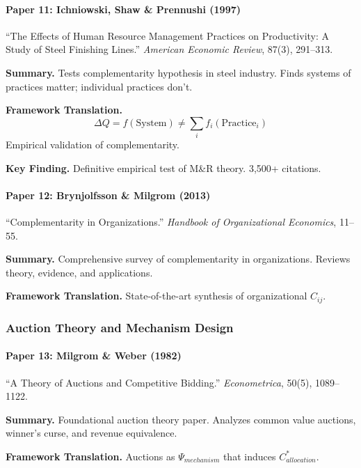 \paragraph{Paper 11: Ichniowski, Shaw \& Prennushi (1997)}

``The Effects of Human Resource Management Practices on Productivity: A Study of Steel Finishing Lines.''
\textit{American Economic Review}, 87(3), 291--313.

\textbf{Summary.}
Tests complementarity hypothesis in steel industry. Finds systems of practices 
matter; individual practices don't.

\textbf{Framework Translation.}
\begin{equation}
\Delta Q = f(\text{System}) \neq \sum_i f_i(\text{Practice}_i)
\end{equation}
Empirical validation of complementarity.

\textbf{Key Finding.}
Definitive empirical test of M\&R theory. 3,500+ citations.

\paragraph{Paper 12: Brynjolfsson \& Milgrom (2013)}

``Complementarity in Organizations.''
\textit{Handbook of Organizational Economics}, 11--55.

\textbf{Summary.}
Comprehensive survey of complementarity in organizations. Reviews theory, 
evidence, and applications.

\textbf{Framework Translation.}
State-of-the-art synthesis of organizational $C_{ij}$.

\subsubsection{Auction Theory and Mechanism Design}

\paragraph{Paper 13: Milgrom \& Weber (1982)}

``A Theory of Auctions and Competitive Bidding.''
\textit{Econometrica}, 50(5), 1089--1122.

\textbf{Summary.}
Foundational auction theory paper. Analyzes common value auctions, 
winner's curse, and revenue equivalence.

\textbf{Framework Translation.}
Auctions as $\Psi_{mechanism}$ that induces $C^*_{allocation}$.

